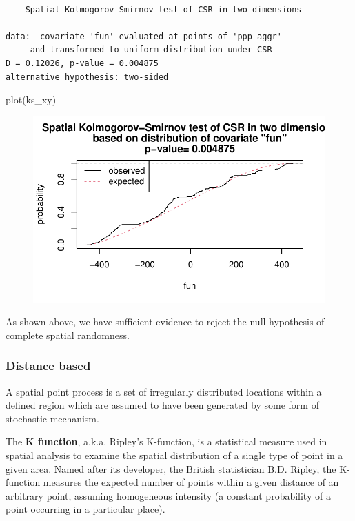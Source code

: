 \documentclass[
  letterpaper,
  DIV=11,
  numbers=noendperiod]{scrreprt}
\newenvironment{Shaded}{\begin{snugshade}}{\end{snugshade}}
\newcommand{\FunctionTok}[1]{\textcolor[rgb]{0.28,0.35,0.67}{#1}}
\newcommand{\NormalTok}[1]{\textcolor[rgb]{0.00,0.23,0.31}{#1}}
\begin{document}
\begin{verbatim}

    Spatial Kolmogorov-Smirnov test of CSR in two dimensions

data:  covariate 'fun' evaluated at points of 'ppp_aggr' 
     and transformed to uniform distribution under CSR
D = 0.12026, p-value = 0.004875
alternative hypothesis: two-sided
\end{verbatim}

\begin{Shaded}
\begin{Highlighting}[]
\FunctionTok{plot}\NormalTok{(ks\_xy)}
\end{Highlighting}
\end{Shaded}

\begin{figure}[H]

{\centering \includegraphics{spatial-tests_files/figure-pdf/unnamed-chunk-36-3.pdf}

}

\end{figure}

As shown above, we have sufficient evidence to reject the null
hypothesis of complete spatial randomness.

\hypertarget{distance-based}{%
\subsubsection{Distance based}\label{distance-based}}

A spatial point process is a set of irregularly distributed locations
within a defined region which are assumed to have been generated by some
form of stochastic mechanism.

The \textbf{K function}, a.k.a. Ripley's K-function, is a statistical
measure used in spatial analysis to examine the spatial distribution of
a single type of point in a given area. Named after its developer, the
British statistician B.D. Ripley, the K-function measures the expected
number of points within a given distance of an arbitrary point, assuming
homogeneous intensity (a constant probability of a point occurring in a
particular place).
\end{document}
